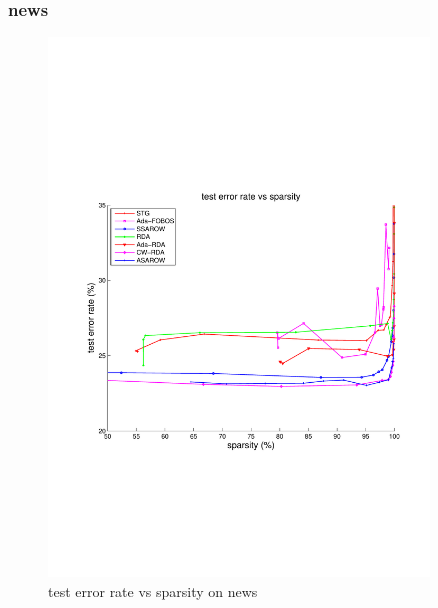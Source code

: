 \documentclass{article}
\begin{document}
\subsubsection{news}
\begin{figure}[!h]
\centering
\includegraphics[width=0.9\textwidth]{./figs/news_test.pdf}
\caption{test error rate vs sparsity on news}
\label{fig:01}
\end{figure}
\end{document}
